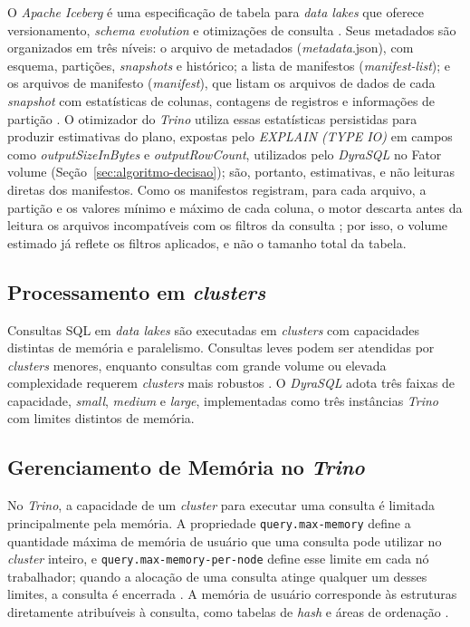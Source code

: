 O \textit{Apache Iceberg} é uma especificação de tabela para \textit{data lakes} que oferece versionamento, \textit{schema evolution} e otimizações de consulta \cite{iceberg2024}. Seus metadados são organizados em três níveis: o arquivo de metadados (\textit{metadata}.json), com esquema, partições, \textit{snapshots} e histórico; a lista de manifestos (\textit{manifest-list}); e os arquivos de manifesto (\textit{manifest}), que listam os arquivos de dados de cada \textit{snapshot} com estatísticas de colunas, contagens de registros e informações de partição \cite{iceberg2024}. O otimizador do \textit{Trino} utiliza essas estatísticas persistidas para produzir estimativas do plano, expostas pelo \textit{EXPLAIN (TYPE IO)} em campos como \textit{outputSizeInBytes} e \textit{outputRowCount}, utilizados pelo \textit{DyraSQL} no Fator volume (Seção~\ref{sec:algoritmo-decisao}); são, portanto, estimativas, e não leituras diretas dos manifestos. Como os manifestos registram, para cada arquivo, a partição e os valores mínimo e máximo de cada coluna, o motor descarta antes da leitura os arquivos incompatíveis com os filtros da consulta \cite{iceberg2024}; por isso, o volume estimado já reflete os filtros aplicados, e não o tamanho total da tabela.

\subsection{Processamento em \textit{clusters}}

Consultas SQL em \textit{data lakes} são executadas em \textit{clusters} com capacidades distintas de memória e paralelismo. Consultas leves podem ser atendidas por \textit{clusters} menores, enquanto consultas com grande volume ou elevada complexidade requerem \textit{clusters} mais robustos \cite{trinoconcepts,ibmbigdata}. O \textit{DyraSQL} adota três faixas de capacidade, \textit{small}, \textit{medium} e \textit{large}, implementadas como três instâncias \textit{Trino} com limites distintos de memória.

\subsection{Gerenciamento de Memória no \textit{Trino}}

No \textit{Trino}, a capacidade de um \textit{cluster} para executar uma consulta é limitada principalmente pela memória. A propriedade \texttt{query.\allowbreak max-memory} define a quantidade máxima de memória de usuário que uma consulta pode utilizar no \textit{cluster} inteiro, e \texttt{query.\allowbreak max-memory-\allowbreak per-node} define esse limite em cada nó trabalhador; quando a alocação de uma consulta atinge qualquer um desses limites, a consulta é encerrada \cite{trinomemory}. A memória de usuário corresponde às estruturas diretamente atribuíveis à consulta, como tabelas de \textit{hash} e áreas de ordenação \cite{trinomemory}.

